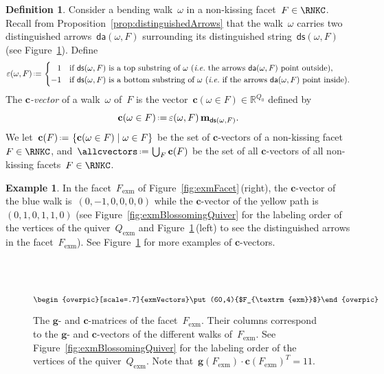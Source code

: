 \documentclass{amsart}
\theoremstyle{definition}
\newtheorem{definition}[theorem]{Definition}
\newtheorem{example}[theorem]{Example}
\newcommand{\R}{\mathbb{R}} %
\renewcommand{\b}[1]{\mathbf{#1}} %
\newcommand{\set}[2]{\left\{ #1 \;\middle|\; #2 \right\}} %
\newcommand{\one}{{1\!\!1}} %
\newcommand{\eqdef}{\mbox{\,\raisebox{0.2ex}{\scriptsize\ensuremath{\mathrm:}}\ensuremath{=}\,}} %
\newcommand{\fref}[1]{Figure~\ref{#1}} %
\newcommand{\ie}{\textit{i.e.}~} %
\newcommand{\darkblue}{\color{darkblue}} %
\newcommand{\defn}[1]{\textsl{\darkblue #1}} %
\newcommand{\ex}{_{\textrm{exm}}} %
\newcommand{\distinguishedArrows}[2]{\mathsf{da}(#1,#2)} %
\newcommand{\distinguishedString}[2]{\mathsf{ds}(#1,#2)} %
\newcommand{\distinguishedSign}[2]{\varepsilon(#1,#2)} %
\newcommand{\gvectors}[1]{\mathbf{g}(#1)} %
\newcommand{\cvector}[2]{\mathbf{c}(#1 \in #2)} %
\newcommand{\cvectors}[1]{\mathbf{c}(#1)} %
\newcommand{\multiplicityVector}{\b{m}} %
\begin{document}
\begin{definition}\label{def: c-vectors}
Consider a bending walk~$\omega$ in a non-kissing facet~$F \in \RNKC$.
Recall from Proposition~\ref{prop:distinguishedArrows} that the walk~$\omega$ carries two distinguished arrows~$\distinguishedArrows{\omega}{F}$ surrounding its distinguished string~$\distinguishedString{\omega}{F}$ (see \fref{fig:gcvectors}).
Define
\[
\distinguishedSign{\omega}{F} \eqdef 
\begin{cases}
\phantom{-}1 & \text{if~$\distinguishedString{\omega}{F}$ is a top substring of~$\omega$ (\ie the arrows~$\distinguishedArrows{\omega}{F}$ point outside),} \\
-1 & \text{if~$\distinguishedString{\omega}{F}$ is a bottom substring of~$\omega$ (\ie if the arrows~$\distinguishedArrows{\omega}{F}$ point inside).}
\end{cases}
\]
The \defn{$\b{c}$-vector} of a walk~$\omega$ of~$F$ is the vector~${\cvector{\omega}{F} \in \R^{Q_0}}$ defined by
\[
\cvector{\omega}{F} \eqdef \distinguishedSign{\omega}{F} \, \multiplicityVector_{\distinguishedString{\omega}{F}}.
\]
We let~$\cvectors{F} \eqdef \set{\cvector{\omega}{F}}{\omega \in F}$ be the set of $\b{c}$-vectors of a non-kissing facet~$F \in \RNKC$, and~$\allcvectors \eqdef \bigcup_F \cvectors{F}$ be the set of all $\b{c}$-vectors of all non-kissing facets~${F \in \RNKC}$.
\end{definition}

\begin{example}
In the facet~$F\ex$ of \fref{fig:exmFacet}\,(right), the $\b{c}$-vector of the blue walk is~$(0,-1,0,0,0,0)$ while the $\b{c}$-vector of the yellow path is~$(0,1,0,1,1,0)$ (see \fref{fig:exmBlossomingQuiver} for the labeling order of the vertices of the quiver~$Q\ex$ and \fref{fig:gcvectors}\,(left) to see the distinguished arrows in the facet~$F\ex$).
See \fref{fig:gcvectors} for more examples of $\b{c}$-vectors.

\begin{figure}[t]
	\capstart
	\centerline{$\raisebox{-1.5cm}{\begin{overpic}[scale=.7]{exmVectors}\put(60,4){$F\ex$}\end{overpic}}$ \qquad }
	\caption{The $\b{g}$- and $\b{c}$-matrices of the facet~$F\ex$. Their columns correspond to the $\b{g}$- and $\b{c}$-vectors of the different walks of~$F\ex$. See \fref{fig:exmBlossomingQuiver} for the labeling order of the vertices of the quiver~$Q\ex$. Note that~$\gvectors{F\ex} \cdot \cvectors{F\ex}^T = \one$.}
	\label{fig:gcvectors}
\end{figure}
\end{example}
\end{document}
